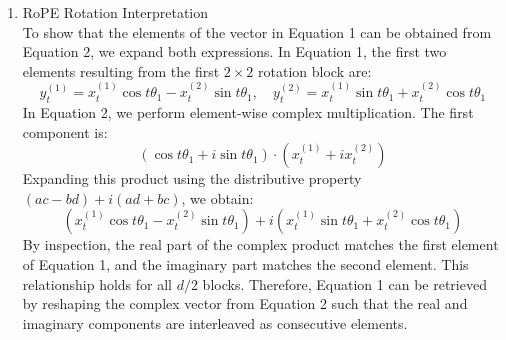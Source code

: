 \documentclass{article}
\begin{document}
\begin{enumerate}
    \item[i.] RoPE Rotation Interpretation \\
    To show that the elements of the vector in Equation 1 can be obtained from Equation 2, we expand both expressions. In Equation 1, the first two elements resulting from the first $2 \times 2$ rotation block are:
    \begin{equation}
        y_t^{(1)} = x_t^{(1)} \cos t\theta_1 - x_t^{(2)} \sin t\theta_1, \quad y_t^{(2)} = x_t^{(1)} \sin t\theta_1 + x_t^{(2)} \cos t\theta_1
    \end{equation}
    In Equation 2, we perform element-wise complex multiplication. The first component is:
    \begin{equation}
        (\cos t\theta_1 + i \sin t\theta_1) \cdot (x_t^{(1)} + i x_t^{(2)})
    \end{equation}
    Expanding this product using the distributive property $(ac - bd) + i(ad + bc)$, we obtain:
    \begin{equation}
        (x_t^{(1)} \cos t\theta_1 - x_t^{(2)} \sin t\theta_1) + i (x_t^{(1)} \sin t\theta_1 + x_t^{(2)} \cos t\theta_1)
    \end{equation}
    By inspection, the real part of the complex product matches the first element of Equation 1, and the imaginary part matches the second element. This relationship holds for all $d/2$ blocks. Therefore, Equation 1 can be retrieved by reshaping the complex vector from Equation 2 such that the real and imaginary components are interleaved as consecutive elements.


\end{enumerate}
\end{document}
